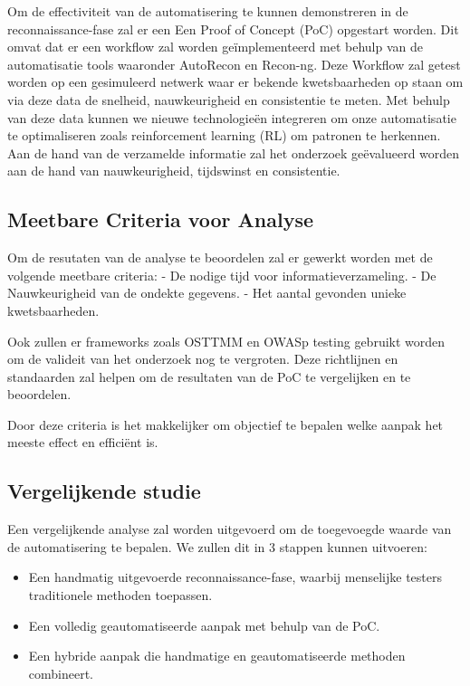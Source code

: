 Om de effectiviteit van de automatisering te kunnen demonstreren in de reconnaissance-fase zal er een Een Proof of Concept (PoC) opgestart worden.
Dit omvat dat er een workflow zal worden geïmplementeerd met behulp van de automatisatie tools waaronder AutoRecon en Recon-ng. Deze
Workflow zal getest worden op een gesimuleerd netwerk waar er bekende kwetsbaarheden op staan om via deze data de snelheid,
nauwkeurigheid en consistentie te meten. Met behulp van deze data kunnen we nieuwe technologieën integreren om onze automatisatie te optimaliseren
zoals reinforcement learning (RL) om patronen te herkennen.
Aan de hand van de verzamelde informatie zal het onderzoek geëvalueerd worden aan de hand van nauwkeurigheid, tijdswinst en consistentie.


\subsection{Meetbare Criteria voor Analyse}

Om de resutaten van de analyse te beoordelen zal er gewerkt worden met de volgende meetbare criteria:
- De nodige tijd voor informatieverzameling.
- De Nauwkeurigheid van de ondekte gegevens.
- Het aantal gevonden unieke kwetsbaarheden.

Ook zullen er frameworks zoals OSTTMM en OWASp testing gebruikt worden om de valideit van het onderzoek nog te vergroten.
Deze richtlijnen en standaarden zal helpen om de resultaten van de PoC te vergelijken en te beoordelen.

Door deze criteria is het makkelijker om objectief te bepalen welke aanpak het meeste effect en efficiënt is.



\subsection{Vergelijkende studie}

Een vergelijkende analyse zal worden uitgevoerd om de toegevoegde waarde van de automatisering te bepalen. We zullen dit in 3 stappen kunnen uitvoeren:

\begin{itemize}
    \item Een handmatig uitgevoerde reconnaissance-fase, waarbij menselijke testers traditionele methoden toepassen.
    \item Een volledig geautomatiseerde aanpak met behulp van de PoC.
    \item Een hybride aanpak die handmatige en geautomatiseerde methoden combineert.
\end{itemize}

